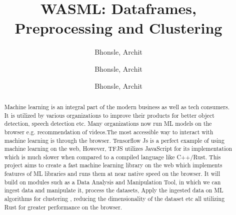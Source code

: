 \documentclass[a4paper,12pt]{report}
\title{WASML: Dataframes, Preprocessing and Clustering}
\author{
  Bhonsle, Archit\\
  \and
  Bhonsle, Archit\\
  \and
  Bhonsle, Archit\\
}
\begin{document}
\maketitle
\tableofcontents

\begin{abstract}
  Machine learning is an integral part of the modern business as well as
  tech consumers. It is utilized by various organizations to improve their
  products for better object detection, speech detection etc. Many
  organizations now run ML models on the browser e.g. recommendation of
  videos.The most accessible way to interact with machine learning is
  through the browser. Tensorflow Js is a perfect example of using machine
  learning on the web, However, TFJS utilizes JavaScript for its
  implementation which is much slower when compared to a compiled language
  like C++/Rust.
  This project aims to create a fast machine learning library on the web
  which implements features of ML libraries and runs them at near native
  speed on the browser. It will build on modules such as a Data Analysis
  and Manipulation Tool, in which we can ingest data and manipulate it,
  process the datasets, Apply the ingested data on ML algorithms for
  clustering , reducing the dimensionality of the dataset etc all utilizing
  Rust for greater performance on the browser.
\end{abstract}
\end{document}
